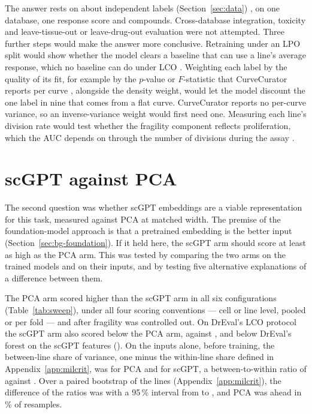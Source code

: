 The answer rests on about \NLinesCV{} independent labels (Section~\ref{sec:data}) \cite{lazic2010}, on one
database, one response score and \NPanel{} compounds. Cross-database integration, toxicity and
leave-tissue-out or leave-drug-out evaluation \cite{dreval} were not attempted. Three further steps would
make the answer more conclusive. Retraining under an LPO split would show whether the model clears a
baseline that can use a line's average response, which no baseline can do under LCO \cite{dreval}.
Weighting each label by the quality of its fit, for example by the $p$-value or $F$-statistic that
CurveCurator reports per curve \cite{bayer2023curvecurator}, alongside the density weight, would let the
model discount the one label in nine that comes from a flat curve. CurveCurator reports no per-curve
variance, so an inverse-variance weight would first need one. Measuring each line's
division rate would test whether the fragility component reflects proliferation, which the AUC depends on
through the number of divisions during the assay \cite{hafner}.

\section{scGPT against PCA}
\label{sec:results-q2}
\label{sec:rd-q2}

The second question was whether scGPT embeddings are a viable representation for this task, measured
against PCA at matched width. The premise of the foundation-model approach is that a pretrained embedding
is the better input (Section~\ref{sec:bg-foundation}). If it held here, the scGPT arm should score at
least as high as the PCA arm. This was tested by comparing the two arms on the trained models and on
their inputs, and by testing five alternative explanations of a difference between them.

The PCA arm scored higher than the scGPT arm in all six configurations (Table~\ref{tab:sweep}), under
all four scoring conventions --- cell or line level, pooled or per fold
--- and after fragility was controlled out. On DrEval's LCO protocol the scGPT arm also scored below
the PCA arm, \DrMlpScgptNorm{} against \DrMlpNorm{}, and below DrEval's forest on the scGPT features
(\DrRfNorm{}). On the inputs
alone, before training, the between-line share of variance, one minus the within-line share defined in
Appendix~\ref{app:milcrit}, was \BtwSharePca{} for PCA and
\BtwShareScgpt{} for scGPT, a between-to-within ratio of \BtwRatioPca{} against \BtwRatioScgpt{}.
Over a paired bootstrap of the \NLinesCV{} lines (Appendix~\ref{app:milcrit}), the difference of the
ratios was \BtwRatioDiff{} with a 95\,\% interval from \BtwRatioDiffLo{} to \BtwRatioDiffHi{}, and PCA was
ahead in \BtwBootPcaAheadPct\,\% of resamples.


